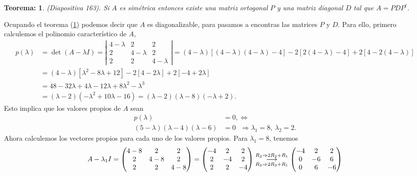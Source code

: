 \documentclass[11pt,letterpaper]{article}
\newcommand{\grstep}[2][\relax]{%
   \ensuremath{\mathrel{
       {\mathop{\longrightarrow}\limits^{#2\mathstrut}_{
                                     \begin{subarray}{l} #1 \end{subarray}}}}}}
\newtheorem{thmt}{Teorema:}
\begin{document}
\begin{enumerate}
\begin{framed}
    \begin{thmt} \label{t_A_simetrica_diagonalizable}
	(Diapositiva 163). Si $A$ es simétrica entonces existe una matriz ortogonal $P$ y una matriz diagonal $D$ tal que $A=PDP^t$.  
	    \end{thmt}
\end{framed}
Ocupando el teorema (\ref{t_A_simetrica_diagonalizable}) podemos decir que $A$ es diagonalizable, para pasamos a encontras las matrices $P$ y $D$. Para ello, primero calculemos el polinomio característico de $A$,
\begin{align*}
p(\lambda) &= \det (A-\lambda I)=
\left|\begin{array}{ccc}
4-\lambda & 2 & 2 \\
2& 4-\lambda & 2\\
2 & 2 & 4-\lambda
\end{array} \right|
=(4-\lambda)[(4-\lambda)(4-\lambda)-4]-2[2(4-\lambda)-4]+2[4-2(4-\lambda)]\\
&=(4-\lambda)[\lambda^2-8\lambda+12]-2[4-2\lambda]+2[-4+2\lambda]\\
&=48-32\lambda+4\lambda-12\lambda+8\lambda^2-\lambda^3\\
&=(\lambda-2)(-\lambda^2+10\lambda-16)=(\lambda-2)(\lambda-8)(-\lambda+2).
\end{align*}
Esto implica que los valores propios de $A$ sean
\begin{align*}
p(\lambda)&=0,\Leftrightarrow\\
(5-\lambda)(\lambda-4)(\lambda-6)&=0\ \ \ \Rightarrow \lambda_1=8, \ \lambda_2=2.
\end{align*}
Ahora calculemos los vectores propios para cada uno de los valores propios. Para $\lambda_1=8$, tenemos 
\begin{align*}
A-\lambda_1I=\begin{pmatrix}
4-8 & 2 & 2\\
2 & 4-8 & 2\\
2 & 2 & 4-8
\end{pmatrix}=\begin{pmatrix}
-4 & 2 & 2\\
2 & -4 & 2\\
2 & 2 & -4
\end{pmatrix}%
\grstep[R_3\Rightarrow 2R_3+R_1]{R_2 \Rightarrow 2R_2+R_1}
%
\begin{pmatrix}
-4 & 2 & 2\\
0 & -6 & 6\\
0 & 6 & -6
\end{pmatrix}

\end{align*}
\end{enumerate}
\end{document}

